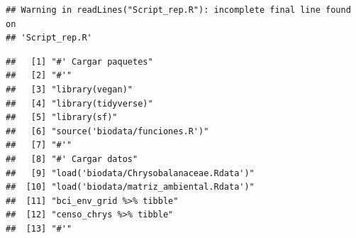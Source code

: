 \documentclass[11pt,]{article}
\begin{document}
\begin{verbatim}
## Warning in readLines("Script_rep.R"): incomplete final line found on
## 'Script_rep.R'
\end{verbatim}

\begin{verbatim}
##   [1] "#' Cargar paquetes"                                                                                                                                                    
##   [2] "#'"                                                                                                                                                                    
##   [3] "library(vegan)"                                                                                                                                                        
##   [4] "library(tidyverse)"                                                                                                                                                    
##   [5] "library(sf)"                                                                                                                                                           
##   [6] "source('biodata/funciones.R')"                                                                                                                                         
##   [7] "#'"                                                                                                                                                                    
##   [8] "#' Cargar datos"                                                                                                                                                       
##   [9] "load('biodata/Chrysobalanaceae.Rdata')"                                                                                                                                
##  [10] "load('biodata/matriz_ambiental.Rdata')"                                                                                                                                
##  [11] "bci_env_grid %>% tibble"                                                                                                                                               
##  [12] "censo_chrys %>% tibble"                                                                                                                                                
##  [13] "#'"                                                                                                                                                                    

\end{verbatim}
\end{document}
